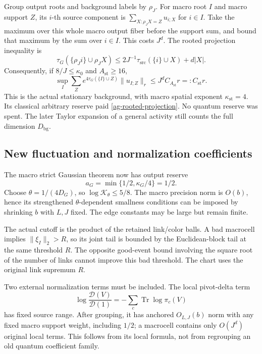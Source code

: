 \documentclass[11pt]{article}
\theoremstyle{remark}
\begin{document}
Group output roots and background labels by $\rho_J$.
For macro root $I$ and macro support $Z$, its $i$-th
source component is $\sum_{X:\rho_JX=Z}u_{i;X}$ for $i\in I$.
Take the maximum over this whole macro output fiber before
the support sum, and bound that maximum by the sum over
$i\in I$. This costs $J^d$. The rooted projection inequality is
\begin{equation}\label{ag-rooted-projection}
 \tau_G(\{\rho_Ji\}\cup\rho_JX)
 \le2J^{-1}\tau_{\mathrm{src}}(\{i\}\cup X)+d|X|.
\end{equation}
Consequently, if $8/J\le\kappa_0$ and $A_{\mathrm{st}}\ge16$,
\begin{equation}\label{ag-macro-stationary}
 \sup_I\sum_Ze^{4\tau_G(\{I\}\cup Z)}\|u_{I;Z}\|_r
 \le J^d C_{A_{\mathrm{st}}}r=:C_{\mathrm{st}}r.
\end{equation}
This is the actual stationary background, with macro spatial
exponent $\kappa_{\mathrm{st}}=4$. Its classical arbitrary
reserve paid \eqref{ag-rooted-projection}. No quantum
reserve was spent. The later Taylor expansion of a general
activity still counts the full dimension $D_{\mathrm{bg}}$.

\subsection{New fluctuation and normalization coefficients}

The macro strict Gaussian theorem now has output reserve
\begin{equation}\label{ag-new-reserve}
 a_G=\min\{1/2,\kappa_G/4\}=1/2.
\end{equation}
Choose $\theta=1/(4D_G)$, so
$\log\mathcal K_\theta\le5/8$. The macro precision norm is
$O(b)$, hence its strengthened $\theta$-dependent smallness
conditions can be imposed by shrinking $b$ with $L,J$ fixed.
The edge constants may be large but remain finite.

The actual cutoff is the product of the retained link/color
balls. A bad macrocell implies $\|\xi_I\|_2>R$, so its joint
tail is bounded by the Euclidean-block tail at the same
threshold $R$. The opposite good-event bound involving the
square root of the number of links cannot improve this bad
threshold. The chart uses the original link supremum $R$.

Two external normalization terms must be included. The local
pivot-delta term
\[
 \log\frac{\mathcal D(V)}{\mathcal D(1)}
       =-\sum_c\operatorname{Tr}\log\pi_c(V)
\]
has fixed source range. After grouping, it has anchored
$O_{L,J}(b)$ norm with any fixed macro support weight,
including $1/2$; a macrocell contains only $O(J^d)$ original
local terms. This follows from its local formula, not from
regrouping an old quantum coefficient family.
\end{document}

